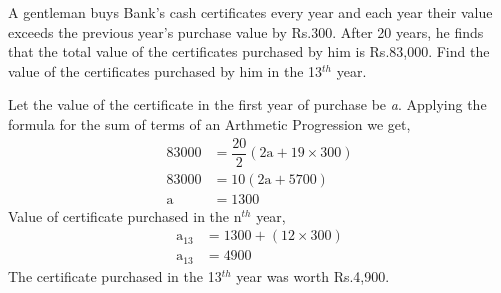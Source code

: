 
%
%
%
%
% 

\question[1] A gentleman buys Bank's cash certificates every year and each year their value exceeds the previous year's purchase value by Rs.300. After 20 years, he finds that the total value of the certificates purchased by him is Rs.83,000. Find the value of the certificates purchased by him in the 13$^{th}$ year.

\ifprintanswers
\fi 

\begin{solution}
	Let the value of the certificate in the first year of purchase be \textit{a}. Applying the formula for the sum of terms of an Arthmetic Progression we get, 
	\begin{align}
			   83000 &= \dfrac{20}{2}\left(2\text{a}+19\times 300\right)\\
			   83000 &= 10\left(2\text{a} + 5700\right) \\
			\text{a} &= 1300   
	\end{align}
	Value of certificate purchased in the n$^{th}$ year,
	\begin{align}
		\text{a}_{13}&= 1300 + \left(12\times 300\right) \\
		\text{a}_{13}&= 4900
	\end{align}
	The certificate purchased in the 13$^{th}$ year was worth Rs.4,900.
\end{solution}
